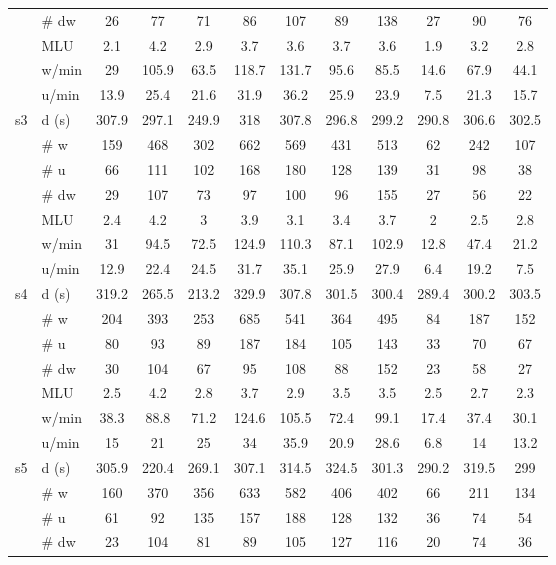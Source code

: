 \begin{screenonly}
\begin{table*}[h]
\begin{tabular*}{\hsize}{@{\extracolsep{\fill}}clcccccccccc}
    & \# dw & 26 & 77 & 71 & 86 & 107 & 89 & 138 & 27 & 90 & 76\\
    & MLU & 2.1 & 4.2 & 2.9 & 3.7 & 3.6 & 3.7 & 3.6 & 1.9 & 3.2 & 2.8\\
    & w/min & 29 & 105.9 & 63.5 & 118.7 & 131.7 & 95.6 & 85.5 & 14.6 & 67.9 & 44.1\\
    & u/min & 13.9 & 25.4 & 21.6 & 31.9 & 36.2 & 25.9 & 23.9 & 7.5 & 21.3 & 15.7\\
    \cmidrule{2-12}
    \multirow{7}{*}{s3} & d (s) & 307.9 & 297.1 & 249.9 & 318 & 307.8 & 296.8 & 299.2 & 290.8 & 306.6 & 302.5\\
    & \# w & 159 & 468 & 302 & 662 & 569 & 431 & 513 & 62 & 242 & 107\\
    & \# u & 66 & 111 & 102 & 168 & 180 & 128 & 139 & 31 & 98 & 38\\
    & \# dw & 29 & 107 & 73 & 97 & 100 & 96 & 155 & 27 & 56 & 22\\
    & MLU & 2.4 & 4.2 & 3 & 3.9 & 3.1 & 3.4 & 3.7 & 2 & 2.5 & 2.8\\
    & w/min & 31 & 94.5 & 72.5 & 124.9 & 110.3 & 87.1 & 102.9 & 12.8 & 47.4 & 21.2\\
    & u/min & 12.9 & 22.4 & 24.5 & 31.7 & 35.1 & 25.9 & 27.9 & 6.4 & 19.2 & 7.5\\
    \cmidrule{2-12}
    \multirow{7}{*}{s4} & d (s) & 319.2 & 265.5 & 213.2 & 329.9 & 307.8 & 301.5 & 300.4 & 289.4 & 300.2 & 303.5\\
    & \# w & 204 & 393 & 253 & 685 & 541 & 364 & 495 & 84 & 187 & 152\\
    & \# u & 80 & 93 & 89 & 187 & 184 & 105 & 143 & 33 & 70 & 67\\
    & \# dw & 30 & 104 & 67 & 95 & 108 & 88 & 152 & 23 & 58 & 27\\
    & MLU & 2.5 & 4.2 & 2.8 & 3.7 & 2.9 & 3.5 & 3.5 & 2.5 & 2.7 & 2.3\\
    & w/min & 38.3 & 88.8 & 71.2 & 124.6 & 105.5 & 72.4 & 99.1 & 17.4 & 37.4 & 30.1\\
    & u/min & 15 & 21 & 25 & 34 & 35.9 & 20.9 & 28.6 & 6.8 & 14 & 13.2\\
    \cmidrule{2-12}
    \multirow{7}{*}{s5} & d (s) & 305.9 & 220.4 & 269.1 & 307.1 & 314.5 & 324.5 & 301.3 & 290.2 & 319.5 & 299\\
    & \# w & 160 & 370 & 356 & 633 & 582 & 406 & 402 & 66 & 211 & 134\\
    & \# u & 61 & 92 & 135 & 157 & 188 & 128 & 132 & 36 & 74 & 54\\
    & \# dw & 23 & 104 & 81 & 89 & 105 & 127 & 116 & 20 & 74 & 36\\

\end{tabular*}
\end{table*}
\end{screenonly}
